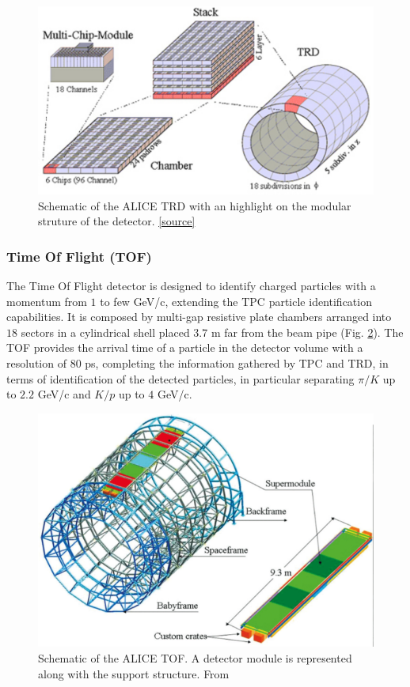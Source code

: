 \begin{figure}[!h]
\begin{center}
\includegraphics[width=0.7\linewidth]{Chapters/Introduction/Figs/trd.pdf}
\caption{Schematic of the ALICE TRD with an highlight on the modular struture of the detector. \href{http://www.lhc-facts.ch/index.php?page=alice}{[source]}}
\label{fig:TRD}
\end{center}
\end{figure}

\subsubsection{Time Of Flight (TOF)}
The Time Of Flight detector is designed to identify charged particles with a momentum from $1$ to few GeV/c, extending the TPC particle identification capabilities. 
It is composed by multi-gap resistive plate chambers arranged into $18$ sectors in a cylindrical shell placed $3.7$ m far from the beam pipe (Fig. \ref{fig:TOF}). 
The TOF provides the arrival time of a particle in the detector volume with a resolution of $80$ ps, completing the information gathered by TPC and TRD, in terms of identification of the detected particles, in particular separating $\pi/K$ up to $2.2$ GeV/c and $K/p$ up to $4$ GeV/c.

\begin{figure}[!h]
\begin{center}
\includegraphics[width=0.7\linewidth]{Chapters/Introduction/Figs/tof.pdf}
\caption{Schematic of the ALICE TOF. A detector module is represented along with the support structure. From \cite{Adam:2017}}
\label{fig:TOF}
\end{center}
\end{figure}

